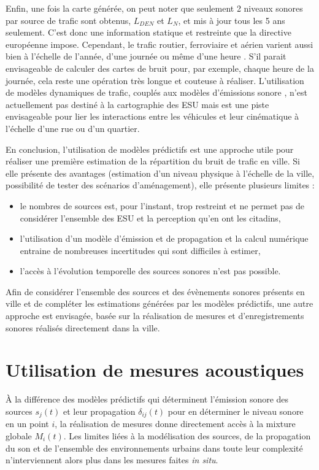 Enfin, une fois la carte générée, on peut noter que seulement 2 niveaux sonores par source de trafic sont obtenus, $L_{DEN}$ et $L_N$, et mis à jour tous les 5 ans seulement. C'est donc une information statique et restreinte que la directive européenne impose. Cependant, le trafic routier, ferroviaire et aérien varient aussi bien à l'échelle de l'année, d'une journée ou même d'une heure \cite{lv2015traffic}. S'il parait envisageable de calculer des cartes de bruit pour, par exemple, chaque heure de la journée, cela reste une opération très longue et couteuse à réaliser.
L'utilisation de modèles dynamiques de trafic, couplés aux modèles d'émissions sonore  \cite{can2010traffic}, n'est actuellement pas destiné à la cartographie des ESU mais est une piste envisageable pour lier les interactions entre les véhicules et leur cinématique à l'échelle d'une rue ou d'un quartier.

En conclusion, l'utilisation de modèles prédictifs est une approche utile pour réaliser une première estimation de la répartition du bruit de trafic en ville. Si elle présente des avantages (estimation d'un niveau physique à l'échelle de la ville, possibilité de tester des scénarios d'aménagement), elle présente plusieurs limites : 

\begin{itemize}
\item le nombres de sources est, pour l'instant, trop restreint et ne permet pas de considérer l'ensemble des ESU et la perception qu'en ont les citadins,
\item l'utilisation d'un modèle d'émission et de propagation et la calcul numérique entraine de nombreuses incertitudes qui sont difficiles à estimer, 
\item l'accès à l'évolution temporelle des sources sonores n'est pas possible.
\end{itemize}

Afin de considérer l'ensemble des sources et des évènements sonores présents en ville et de compléter les estimations générées par les modèles prédictifs, une autre approche est envisagée, basée sur la réalisation de mesures et d'enregistrements sonores réalisés directement dans la ville.

\section{Utilisation de mesures acoustiques}

À la différence des modèles prédictifs qui déterminent l'émission sonore des sources $s_j(t)$ et leur propagation $\delta_{ij}(t)$ pour en déterminer le niveau sonore en un point $i$, la réalisation de mesures donne directement accès à la mixture globale $M_{i}(t)$. Les limites liées à la modélisation des sources, de la propagation du son et de l'ensemble des environnements urbains dans toute leur complexité n'interviennent alors plus dans les mesures faites \textit{in situ}.

